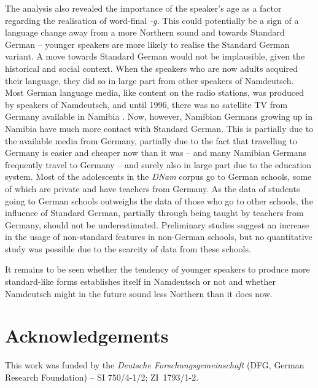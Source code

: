 \documentclass[output=paper]{langsci/langscibook}
\begin{document}
The analysis also revealed the importance of the speaker’s age as a factor regarding the realisation of word-final \textit{-g.} This could potentially be a sign of a language change away from a more Northern sound and towards Standard German -- younger speakers are more likely to realise the Standard German variant. A move towards Standard German would not be implausible, given the historical and social context. When the speakers who are now adults acquired their language, they did so in large part from other speakers of Namdeutsch. Most German language media, like content on the radio stations, was produced by speakers of Namdeutsch, and until 1996, there was no satellite TV from Germany available in Namibia \citep[25]{kroll-tjingaete_strukturelle_2018}. Now, however, Namibian Germans growing up in Namibia have much more contact with Standard German. This is partially due to the available media from Germany, partially due to the fact that travelling to Germany is easier and cheaper now than it was – and many Namibian Germans frequently travel to Germany – and surely also in large part due to the education system. Most of the adolescents in the \textit{DNam} corpus go to German schools, some of which are private and have teachers from Germany. As the data of students going to German schools outweighs the data of those who go to other schools, the influence of Standard German, partially through being taught by teachers from Germany, should not be underestimated. Preliminary studies suggest an increase in the usage of non-standard features in non-German schools, but no quantitative study was possible due to the scarcity of data from these schools.

It remains to be seen whether the tendency of younger speakers to produce more standard-like forms establishes itself in Namdeutsch or not and whether Namdeutsch might in the future sound less Northern than it does now.

\section*{Acknowledgements}
This work was funded by the \textit{Deutsche Forschungsgemeinschaft} (DFG, German Research Foundation) – SI 750/4-1/2; ZI~1793/1-2.

{\sloppy\printbibliography[heading=subbibliography,notkeyword=this]}
\end{document}
